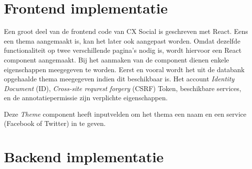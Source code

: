 \section{Frontend implementatie}
Een groot deel van de frontend code van CX Social is geschreven met React. %
Eens een thema aangemaakt is, kan het later ook aangepast worden. Omdat dezelfde functionaliteit op twee verschillende pagina's nodig is, wordt hiervoor een React component aangemaakt. Bij het aanmaken van de component dienen enkele eigenschappen meegegeven te worden. Eerst en vooral wordt het uit de databank opgehaalde thema meegegeven indien dit beschikbaar is. %
Het account \textit{Identity Document} (ID), \textit{Cross-site requrest forgery} (CSRF) Token, beschikbare services, en de annotatiepermissie zijn verplichte eigenschappen. 





Deze \textit{Theme} component heeft inputvelden om het thema een naam en een service (Facebook of Twitter) in te geven. 



\section{Backend implementatie}


